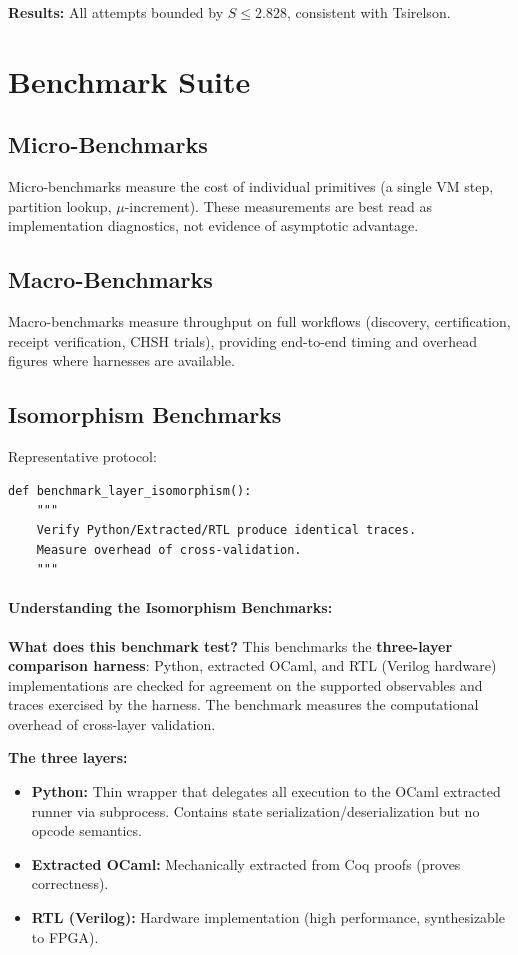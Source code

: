 \textbf{Results:} All attempts bounded by $S \le 2.828$, consistent with Tsirelson.

\section{Benchmark Suite}

\subsection{Micro-Benchmarks}

Micro-benchmarks measure the cost of individual primitives (a single VM step, partition lookup, $\mu$-increment). These measurements are best read as implementation diagnostics, not evidence of asymptotic advantage.

\subsection{Macro-Benchmarks}

Macro-benchmarks measure throughput on full workflows (discovery, certification, receipt verification, CHSH trials), providing end-to-end timing and overhead figures where harnesses are available.

\subsection{Isomorphism Benchmarks}

Representative protocol:
\begin{lstlisting}
def benchmark_layer_isomorphism():
    """
    Verify Python/Extracted/RTL produce identical traces.
    Measure overhead of cross-validation.
    """
\end{lstlisting}

\paragraph{Understanding the Isomorphism Benchmarks:}

\textbf{What does this benchmark test?} This benchmarks the \textbf{three-layer comparison harness}: Python, extracted OCaml, and RTL (Verilog hardware) implementations are checked for agreement on the supported observables and traces exercised by the harness. The benchmark measures the computational overhead of cross-layer validation.

\textbf{The three layers:}
\begin{itemize}
    \item \textbf{Python:} Thin wrapper that delegates all execution to the OCaml extracted runner via subprocess. Contains state serialization/deserialization but no opcode semantics.
    \item \textbf{Extracted OCaml:} Mechanically extracted from Coq proofs (proves correctness).
    \item \textbf{RTL (Verilog):} Hardware implementation (high performance, synthesizable to FPGA).
\end{itemize}

